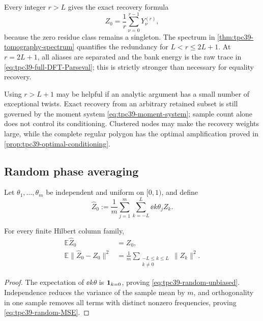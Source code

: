 Every integer \(r>L\) gives the exact recovery formula
\begin{equation}
 Z_0=\frac1r\sum_{\nu=0}^{r-1}Y_\nu^{(r)},
 \label{eq:tpc39-redundant-recovery}
\end{equation}
because the zero residue class remains a singleton.  The spectrum in
\cref{thm:tpc39-tomography-spectrum} quantifies the redundancy for
\(L<r\le2L+1\).  At \(r=2L+1\), all aliases are separated and the bank
energy is the raw trace in \eqref{eq:tpc39-full-DFT-Parseval}; this is
strictly stronger than necessary for equality recovery.

Using \(r>L+1\) may be helpful if an analytic argument has a small number
of exceptional twists.  Exact recovery from an arbitrary retained subset
is still governed by the moment system
\eqref{eq:tpc39-moment-system}; sample count alone does not control its
conditioning.  Clustered nodes may make the recovery weights large, while
the complete regular polygon has the optimal amplification proved in
\cref{prop:tpc39-optimal-conditioning}.

\subsection{Random phase averaging}

Let \(\theta_1,\ldots,\theta_m\) be independent and uniform on
\([0,1)\), and define
\begin{equation}
 \widehat Z_0
 :=\frac1m\sum_{j=1}^{m}
 \sum_{k=-L}^{L}\ee{k\theta_j}Z_k.
 \label{eq:tpc39-random-estimator}
\end{equation}

\begin{proposition}
\label{prop:tpc39-random-MSE}
For every finite Hilbert column family,
\begin{align}
 \mathbb E\widehat Z_0&=Z_0,
 \label{eq:tpc39-random-unbiased}\\
 \mathbb E\|\widehat Z_0-Z_0\|^2
 &=\frac1m\sum_{\substack{-L\le k\le L\\k\ne0}}
 \|Z_k\|^2.
 \label{eq:tpc39-random-MSE}
\end{align}
\end{proposition}

\begin{proof}
The expectation of \(\ee{k\theta}\) is \(\mathbf 1_{k=0}\), proving
\eqref{eq:tpc39-random-unbiased}.  Independence reduces the variance of
the sample mean by \(m\), and orthogonality in one sample removes all
terms with distinct nonzero frequencies, proving
\eqref{eq:tpc39-random-MSE}.
\end{proof}

